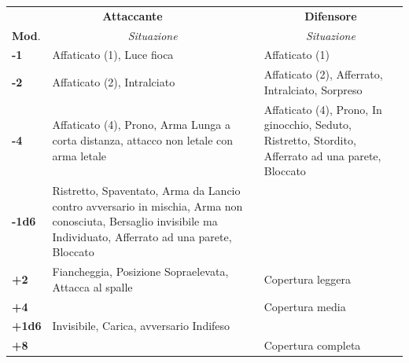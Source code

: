 \noindent\begin{tabularx}{\linewidth}{l|X|X}
	\toprule
\multicolumn{2}{c}{\textbf{Attaccante}}&\multicolumn{1}{c}{\textbf{Difensore}}\\
\textbf{Mod}.&\multicolumn{1}{c}{\emph{Situazione}}&\multicolumn{1}{c}{\emph{Situazione}}\\
\toprule
\textbf{-1}& Affaticato (1), Luce fioca&Affaticato (1)\\

\textbf{-2}& Affaticato (2), Intralciato & Affaticato (2), Afferrato, Intralciato, Sorpreso\\

\textbf{-4}& Affaticato (4), Prono, Arma Lunga a corta distanza, attacco non letale con arma letale& Affaticato (4), Prono, In ginocchio, Seduto, Ristretto, Stordito, Afferrato ad una parete, Bloccato\\

\textbf{-1d6}& Ristretto, Spaventato, Arma da Lancio contro avversario in mischia, Arma non conosciuta, Bersaglio invisibile ma Individuato, Afferrato ad una parete, Bloccato&\\

%
\textbf{+2}& Fiancheggia, Posizione Sopraelevata, Attacca al spalle& Copertura leggera\\

\textbf{+4}&& Copertura media\\

\textbf{+1d6}& Invisibile, Carica, avversario Indifeso& \\

\textbf{+8}&& Copertura completa
\end{tabularx}

\medskip

